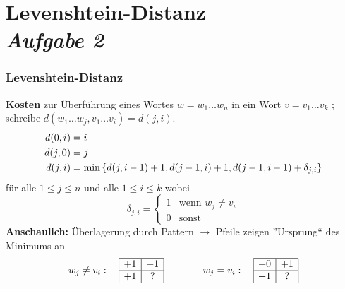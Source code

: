 \documentclass{beamer}
\begin{document}

\section{Levenshtein-Distanz \\ \textit{Aufgabe 2}}

\begin{frame} \frametitle{Levenshtein-Distanz}
	\textbf{Kosten} zur Überführung eines Wortes $w = w_1 \dots w_n$ in ein Wort $v = v_1 \dots v_k$ ; schreibe $d(w_1 \dots w_j, v_1 \dots v_i) = d(j,i)$.
	\pause
	\begin{align*}
		d(0,i) &= i \\
		d(j,0) &= j \\
		d(j,i) &= \min \left\{  d(j,i-1) + 1, d(j-1,i) + 1 , d(j-1, i-1) + \delta_{j,i} \right\}
	\end{align*}
	für alle $1 \le j \le n$ und alle $1 \le i \le k$ wobei
	\begin{equation*}
		\delta_{j,i} = \begin{cases}
		1 & \text{wenn } w_j \neq v_i \\
		0 & \text{sonst}
		\end{cases} 
	\end{equation*}
	\pause
	\textbf{Anschaulich:} 
	Überlagerung durch Pattern
	$\to$ Pfeile zeigen ''Ursprung`` des Minimums an
	\begin{equation*}
		w_j \neq v_i : \quad \begin{array}{|c|c|}
			\hline +1 & +1 \\ \hline +1 & ? \\ \hline
		\end{array}
		\qquad \qquad
		w_j = v_i : \quad 
		\begin{array}{|c|c|}
		\hline +0 & +1 \\ \hline +1 & ? \\ \hline
		\end{array}
	\end{equation*}
\end{frame}
\end{document}
